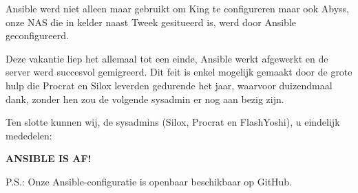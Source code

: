 \documentclass{article}
\begin{document}
Ansible werd niet alleen maar gebruikt om King te configureren maar ook Abyss, onze NAS die in kelder naast Tweek gesitueerd is, werd door Ansible geconfigureerd.

Deze vakantie liep het allemaal tot een einde, Ansible werkt afgewerkt en de server werd succesvol gemigreerd. \newline
Dit feit is enkel mogelijk gemaakt door de grote hulp die Procrat en Silox leverden gedurende het jaar, waarvoor duizendmaal dank, zonder hen zou de volgende sysadmin er nog aan bezig zijn.

Ten slotte kunnen wij, de sysadmins (Silox, Procrat en FlashYoshi), u eindelijk mededelen:

\textbf{ANSIBLE IS AF!}

{\small P.S.: Onze Ansible-configuratie is openbaar beschikbaar op GitHub.}
\end{document}
